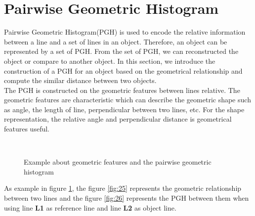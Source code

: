 \section{Pairwise Geometric Histogram}
Pairwise Geometric Histogram(PGH)\cite{evans1993use} is used to encode the relative information between a line and a set of lines in an object. Therefore, an object can be represented by a set of PGH. From the set of PGH, we can reconstructed the object or compare to another object. In this section, we introduce the construction of a PGH for an object based on the geometrical relationship and compute the similar distance between two objects.\\
The PGH is constructed on the geometric features between lines relative. The geometric features are characteristic which can describe the geometric shape such as angle, the length of line, perpendicular between two lines, etc. For the shape representation, the relative angle and perpendicular distance is geometrical features useful.\\
\begin{figure}[h!]
\centering
{}~~
\caption{Example about geometric features and the pairwise geometric histogram}
\label{fig:32}
\end{figure}
As example in figure \ref{fig:32}, the figure \ref{fig:25} represents the geometric relationship between two lines and the figure \ref{fig:26} represents the PGH between them when using line \textbf{L1} as reference line and line \textbf{L2} as object line.

